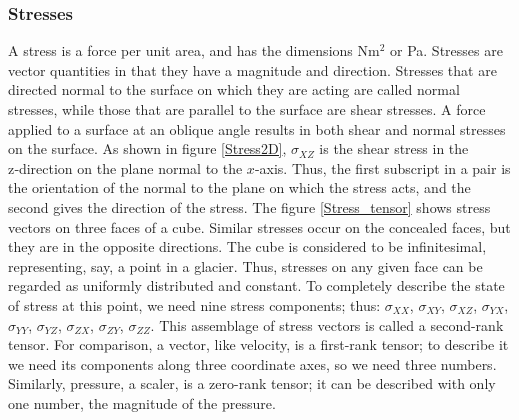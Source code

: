\documentclass{article}
\begin{document}
\subsubsection{Stresses}
A stress is a force per unit area, and has the dimensions Nm$^2$ or Pa. Stresses are vector quantities in that they have a magnitude and direction. Stresses that are directed normal to the surface on which they are acting are called normal stresses, while those that are parallel to the surface are shear stresses. A force applied to a surface at an oblique angle results in both shear and normal stresses on the surface.
As shown in figure \ref{Stress2D}, $\sigma_{XZ}$ is the shear stress in the z‑direction on the plane normal to the $x$-axis. Thus, the ﬁrst subscript in a pair is the orientation of the normal to the plane on which the stress acts, and the second gives the direction of the stress. The figure \ref{Stress_tensor} shows stress vectors on three faces of a cube. Similar stresses occur on the concealed faces, but they are in the opposite directions. The cube is considered to be infinitesimal, representing, say, a point in a glacier. Thus, stresses on any given face can be regarded as uniformly distributed and constant. To completely describe the state of stress at this point, we need nine stress components; thus: $\sigma_{XX}$, $\sigma_{XY}$, $\sigma_{XZ}$, $\sigma_{YX}$, $\sigma_{YY}$, $\sigma_{YZ}$, $\sigma_{ZX}$, $\sigma_{ZY}$, $\sigma_{ZZ}$. This assemblage of stress vectors is called a second-rank tensor. For comparison, a vector, like velocity, is a ﬁrst-rank tensor; to describe it we need its components along three coordinate axes, so we need three numbers. Similarly, pressure, a scaler, is a zero-rank tensor; it can be described with only one number, the magnitude of the pressure.
\end{document}
